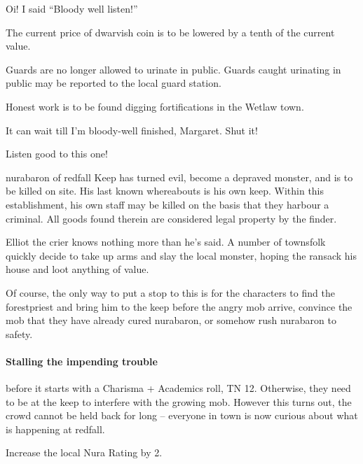 \begin{multicols}{2}
\begin{speechtext}
    Oi! I said ``Bloody well listen!''

    The current price of dwarvish coin is to be lowered by a tenth of the current value.

    Guards are no longer allowed to urinate in public.
    Guards caught urinating in public may be reported to the local guard station.

    Honest work is to be found digging fortifications in the Wetlaw town.

    It can wait till I'm bloody-well finished, Margaret.  Shut it!

    Listen good to this one!

    \gls{nurabaron} of \gls{redfall} Keep has turned evil, become a depraved monster, and is to be killed on site.  His last known whereabouts is his own keep.  Within this establishment, his own staff may be killed on the basis that they harbour a criminal.  All goods found therein are considered legal property by the finder.

\end{speechtext}

Elliot the crier knows nothing more than he's said.  A number of townsfolk quickly decide to take up arms and slay the local monster, hoping the ransack his house and loot anything of value.

Of course, the only way to put a stop to this is for the characters to find the \gls{forestpriest} and bring him to the keep before the angry mob arrive, convince the mob that they have already cured \gls{nurabaron}, or somehow rush \gls{nurabaron} to safety.

\paragraph{Stalling the impending trouble}
before it starts with a Charisma + Academics roll, TN 12.
Otherwise, they need to be at the keep to interfere with the growing mob.
However this turns out, the crowd cannot be held back for long -- everyone in \gls{town} is now curious about what is happening at \gls{redfall}.

Increase the local Nura Rating by 2.

\stopcontents[sq]

\resumecontents[Forest]

\label{necromancerspet}

\stopcontents[Forest]

\startcontents[sq]


\end{multicols}
